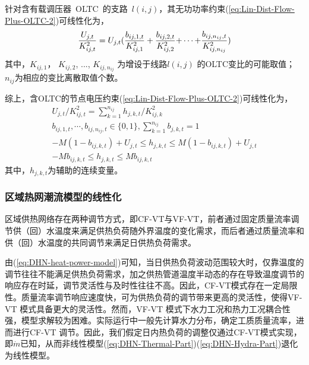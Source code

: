 针对含有载调压器~OLTC~的支路~$l(i,j)$，其无功功率约束(\ref{eq:Lin-Dist-Flow-Plus-OLTC-2})可线性化为，
\begin{equation}
\label{eq:OLTC-approxi-1}
\frac{{{U_{j,t}}}}{{K_{ij,t}^2}} = {U_{j,t}}({\frac{{{b_{ij,1,t}}}}{{K_{ij,1}^2}} + \frac{{{b_{ij,2,t}}}}{{K_{ij,2}^2}}{\rm{ + }} \cdots {\rm{ + }}\frac{{{b_{ij,{n_{ij}},t}}}}{{K_{ij,{n_{ij}}}^2}}})
\end{equation}
其中，$K_{ij,1}^{}$， $K_{ij,2}^{}$, ..., $K_{ij,{n_{ij}}}^{}$ 为增设于线路$l(i,j)$ 的OLTC变比的可能取值；${n_{ij}}$为相应的变比离散取值个数。

综上，含OLTC的节点电压约束(\ref{eq:Lin-Dist-Flow-Plus-OLTC-2})可线性化为\cite{PDN-Model-Reactive-Power-14, PDN-Model-Reactive-Power-DT-16, CAES-IES-16-Rui}，
\begin{subequations}
\label{eq:OLTC-approxi-2}
\begin{gather}
{{U_{j,t}}/K_{ij,t}^2 = \sum\limits_{k = 1}^{{n_{ij}}} {{h_{j,k,t}}/K_{ij,k}^2} }\\
{{b_{ij,1,t}}, \cdots ,{b_{ij,{n_{ij}},t}} \in \{ 0,1\} ,\sum\limits_{k = 1}^{{n_{ij}}} {{b_{j,k,t}}}  = 1}\\
{ - M({1 - {b_{ij,k,t}}}) + {U_{j,t}} \le {h_{j,k,t}} \le M({1 - {b_{ij,k,t}}}) + {U_{j,t}}}\\
{ - M{b_{ij,k,t}} \le {h_{j,k,t}} \le M{b_{ij,k,t}}}
\end{gather}
\end{subequations}
其中，$h_{j,k,t}$为辅助的连续变量。

\subsubsection{区域热网潮流模型的线性化}

区域供热网络存在两种调节方式，即CF-VT与VF-VT\cite{DHN-CFVT-2013}，前者通过固定质量流率调节供（回）水温度来满足供热负荷随外界温度的变化需求，而后者通过质量流率和供（回）水温度的共同调节来满足日供热负荷需求。

由(\ref{eq:DHN-heat-power-model})可知，当日供热负荷波动范围较大时，仅靠温度的调节往往不能满足供热负荷需求，加之供热管道温度半动态的存在导致温度调节的响应存在时延\cite{IES-DHN-16-LZG}，调节灵活性与及时性往往不高。因此，CF-VT模式存在一定局限性。质量流率调节响应速度快，可为供热负荷的调节带来更高的灵活性，使得VF-VT 模式具备更大的灵活性。然而，VF-VT 模式下水力工况和热力工况耦合性强，模型求解较为困难。实际运行中一般先计算水力分布，确定工质质量流率，进而进行CF-VT 调节。因此，我们假定日内热负荷的调整仅通过CF-VT模式实现，即$\dot m$已知，从而非线性模型(\ref{eq:DHN-Thermal-Part})(\ref{eq:DHN-Hydra-Part})退化为线性模型。

